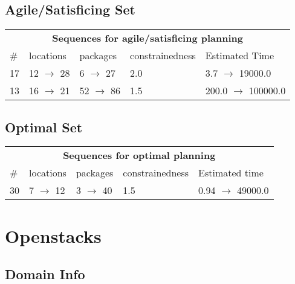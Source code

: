 \documentclass{article}
\begin{document}
                         \subsection*{Agile/Satisficing Set}

                        \begin{center}
                        \begin{tabular}{l|l|l|l|l}
                        \multicolumn{5}{c}{\bf \large Sequences for agile/satisficing planning}\\
                        \# & locations & packages & constrainedness & Estimated Time\\\midrule
                        17&12 $\rightarrow$ 28&6 $\rightarrow$ 27&2.0&3.7 $\rightarrow$ 19000.0\\
13&16 $\rightarrow$ 21&52 $\rightarrow$ 86&1.5&200.0 $\rightarrow$ 100000.0
                        \end{tabular}
                        \end{center}
                    
                            \subsection*{Optimal Set}

                            \begin{center}
                            \begin{tabular}{l|l|l|l|l}
                            \multicolumn{5}{c}{\bf \large Sequences for optimal planning}\\
                            \# & locations & packages & constrainedness & Estimated time\\\midrule
                            30&7 $\rightarrow$ 12&3 $\rightarrow$ 40&1.5&0.94 $\rightarrow$ 49000.0
                            \end{tabular}
                            \end{center}
                    \newpage \section{Openstacks}
                    \subsection*{Domain Info}
\end{document}
